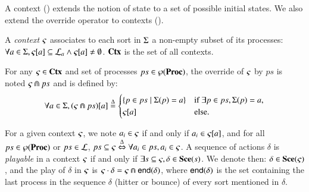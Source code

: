 A context () extends the notion of state to a set of possible initial states.
We also extend the override operator to contexts ().
\begin{definition}
\label{def:context}
  A \emph{context} $\varsigma$ associates to each sort in $\Sigma$ a non-empty subset of its processes:
  $\forall a \in \Sigma, {\varsigma[a]} \subseteq \mathcal{L}_a \wedge {\varsigma[a]} \neq \emptyset$.
  $\mathbf{Ctx}$ is the set of all contexts.
\end{definition}
%
\begin{definition}[$\Cap: \Ctx \times \powerset(\PHproc) \rightarrow \Ctx$]
\label{def:ctxcap}
  For any $\varsigma\in\mathbf{Ctx}$ and set of processes $ps \in \wp(\mathbf{Proc})$,
  the override of $\varsigma$ by $ps$ is noted $\varsigma \Cap ps$ and is defined by:
  \[ \forall a \in \Sigma, {(\varsigma \Cap ps)[a]} \stackrel{\Delta}=
  \begin{cases}
    \{ p \in ps \mid \Sigma(p)=a \} & \text{if } \exists p \in ps, \Sigma(p)=a,\\
    {\varsigma[a]} & \text{else.}
  \end{cases}
  \]
\end{definition}
\noindent
For a given context $\varsigma$, we note $a_i \in \varsigma$ if and only if $a_i \in {\varsigma[a]}$,
and for all $ps \in \wp(\mathbf{Proc})$ or $ps \in \mathcal{L}$, $ps \subseteq \varsigma \stackrel{\Delta}\Leftrightarrow \forall a_i \in ps, a_i \in \varsigma$.
A sequence of actions $\delta$ is \emph{playable} in a context $\varsigma$ if and only if 
$\exists s \subseteq \varsigma, \delta \in \mathbf{Sce}(s)$.
We denote then: $\delta \in \mathbf{Sce}(\varsigma)$,
and the play of $\delta$ in $\varsigma$ is $\varsigma \cdot \delta = \varsigma \Cap \mathsf{end}(\delta)$,
where $\mathsf{end}(\delta)$ is the set containing the last process in the sequence $\delta$ (hitter or bounce) of every sort mentioned in $\delta$.

